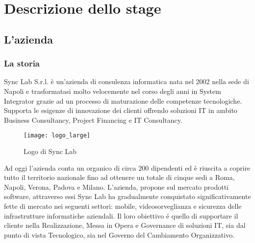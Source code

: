 
\chapter{Descrizione dello stage}
\label{cap:descrizione-stage}



\section{L'azienda}

\subsection{La storia}

Sync Lab S.r.l. è un'azienda di consulenza informatica nata nel 2002 nella sede di Napoli e trasformatasi molto velocemente nel corso degli anni in System Integrator grazie ad un processo di maturazione delle competenze tecnologiche. Supporta le esigenze di innovazione dei clienti offrendo soluzioni IT in ambito Business Consultancy, Project Financing e IT Consultancy.\\
\begin{figure}[h]
	\begin{center}
		\texttt{[image: logo\_large]}
		\caption{Logo di Sync Lab}
	\end{center}
\end{figure}
Ad oggi l'azienda conta un organico di circa 200 dipendenti ed è riuscita a coprire tutto il territorio nazionale fino ad ottenere un totale di cinque sedi a Roma, Napoli, Verona, Padova e Milano. L'azienda, propone sul mercato prodotti software, attraverso essi Sync Lab ha gradualmente conquistato significativamente fette di mercato nei seguenti settori: mobile, videosorveglianza e sicurezza delle infrastrutture informatiche aziendali.
Il loro obiettivo é quello di supportare il cliente nella Realizzazione, Messa in Opera e Governance di soluzioni IT, sia dal punto di vista Tecnologico, sia nel Governo del Cambiamento Organizzativo.

